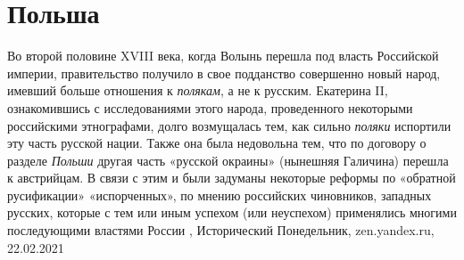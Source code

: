  
 
 
 
 
\chapter{Польша}
\label{sec:slova.polsha}

Во второй половине XVIII века, когда Волынь перешла под власть Российской
империи, правительство получило в свое подданство совершенно новый народ,
имевший больше отношения к \emph{полякам}, а не к русским. Екатерина II, ознакомившись
с исследованиями этого народа, проведенного некоторыми российскими этнографами,
долго возмущалась тем, как сильно \emph{поляки} испортили эту часть русской нации.
Также она была недовольна тем, что по договору о разделе \emph{Польши} другая часть
«русской окраины» (нынешняя Галичина) перешла к австрийцам. В связи с этим и
были задуманы некоторые реформы по «обратной русификации» «испорченных», по
мнению российских чиновников, западных русских, которые с тем или иным успехом
(или неуспехом) применялись многими последующими властями России
, 
Исторический Понедельник, zen.yandex.ru, 22.02.2021 


